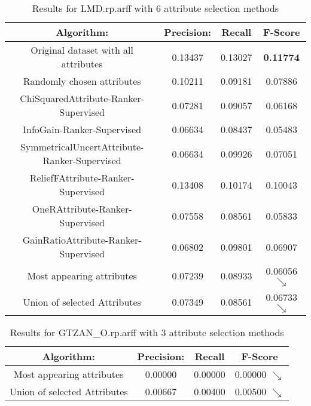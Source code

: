 \begin{table}[p]
\begin{center}
\begin{tabular}{|c|c|c|c|}
\hline Algorithm: & Precision: & Recall & F-Score\\
\hline Original dataset with all attributes  & 0.13437   &  0.13027  &
 {\bf 0.11774}\\
\hline Randomly chosen attributes & 0.10211 & 0.09181 & 0.07886\\
\hline ChiSquaredAttribute-Ranker-Supervised & 0.07281 & 0.09057 & 0.06168\\
\hline InfoGain-Ranker-Supervised & 0.06634 & 0.08437 & 0.05483\\
\hline SymmetricalUncertAttribute-Ranker-Supervised & 0.06634 & 0.09926 &
0.07051\\
\hline ReliefFAttribute-Ranker-Supervised & 0.13408 & 0.10174 & 0.10043\\
\hline OneRAttribute-Ranker-Supervised & 0.07558 & 0.08561 & 0.05833\\
\hline GainRatioAttribute-Ranker-Supervised & 0.06802 & 0.09801 & 0.06907\\
\hline Most appearing attributes & 0.07239 & 0.08933 & 0.06056 $\searrow$\\
\hline Union of selected Attributes & 0.07349 & 0.08561 & 0.06733 $\searrow$\\

\hline
\end{tabular}
\caption{Results for LMD.rp.arff with 6 attribute selection methods}
\label{table:classifier:LMD6}
\end{center}
\end{table}





\begin{table}[p]
\begin{center}
\begin{tabular}{|c|c|c|c|}
\hline Algorithm: & Precision: & Recall & F-Score\\
\hline Most appearing attributes & 0.00000 & 0.00000 & 0.00000 $\searrow$\\
\hline Union of selected Attributes & 0.00667 & 0.00400 & 0.00500 $\searrow$\\

\hline
\end{tabular}
\caption{Results for GTZAN\_O.rp.arff with 3 attribute selection methods}
\label{table:classifier:GTZANO3}
\end{center}
\end{table}


